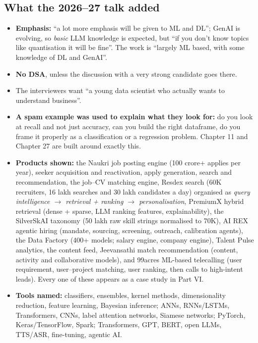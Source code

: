 \subsection*{What the 2026--27 talk added}
\begin{itemize}
\item \textbf{Emphasis:} ``a lot more emphasis will be given to ML and DL''; GenAI is evolving, so
  \emph{basic} LLM knowledge is expected, but ``if you don't know topics like quantisation it will be
  fine''. The work is ``largely ML based, with some knowledge of DL and GenAI''.
\item \textbf{No DSA}, unless the discussion with a very strong candidate goes there.
\item The interviewers want ``a young data scientist who actually wants to understand business''.
\item \textbf{A spam example was used to explain what they look for:} do you look at recall and not just
  accuracy, can you build the right dataframe, do you frame it properly as a classification or a
  regression problem. Chapter 11 and Chapter 27 are built around exactly this.
\item \textbf{Products shown:} the Naukri job posting engine (100 crore+ applies per year), seeker
  acquisition and reactivation, apply generation, search and recommendation, the job--CV matching engine,
  Resdex search (60K recruiters, 16 lakh searches and 30 lakh candidates a day) organised as
  \emph{query intelligence $\to$ retrieval + ranking $\to$ personalisation}, PremiumX hybrid retrieval
  (dense + sparse, LLM ranking features, explainability), the SilverSkAI taxonomy (50 lakh raw skill strings
  normalised to 70K), AI REX agentic hiring (mandate, sourcing, screening, outreach, calibration agents),
  the Data Factory (400+ models; salary engine, company engine), Talent Pulse analytics, the content feed,
  Jeevansathi match recommendation (content, activity and collaborative models), and 99acres ML-based
  telecalling (user requirement, user--project matching, user ranking, then calls to high-intent leads).
  Every one of these appears as a case study in Part VI.
\item \textbf{Tools named:} classifiers, ensembles, kernel methods, dimensionality reduction, feature
  learning, Bayesian inference; ANNs, RNNs/LSTMs, Transformers, CNNs, label attention networks, Siamese
  networks; PyTorch, Keras/TensorFlow, Spark; Transformers, GPT, BERT, open LLMs, TTS/ASR, fine-tuning,
  agentic AI.
\end{itemize}

